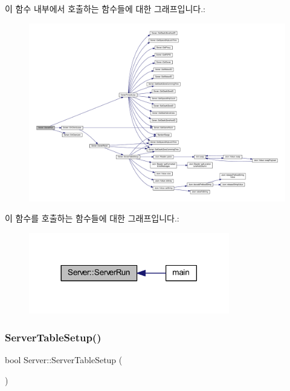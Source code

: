 이 함수 내부에서 호출하는 함수들에 대한 그래프입니다.\+:
\nopagebreak
\begin{figure}[H]
\begin{center}
\leavevmode
\includegraphics[width=350pt]{class_server_acb327f7980ef16c40087bdafcef5ad7a_cgraph}
\end{center}
\end{figure}
이 함수를 호출하는 함수들에 대한 그래프입니다.\+:\nopagebreak
\begin{figure}[H]
\begin{center}
\leavevmode
\includegraphics[width=248pt]{class_server_acb327f7980ef16c40087bdafcef5ad7a_icgraph}
\end{center}
\end{figure}
\mbox{\label{class_server_a2ea82221dd5edd72b97a465a9753a68e}} 
\subsubsection{\texorpdfstring{Server\+Table\+Setup()}{ServerTableSetup()}}
{\footnotesize\ttfamily bool Server\+::\+Server\+Table\+Setup (\begin{DoxyParamCaption}{ }\end{DoxyParamCaption})}




